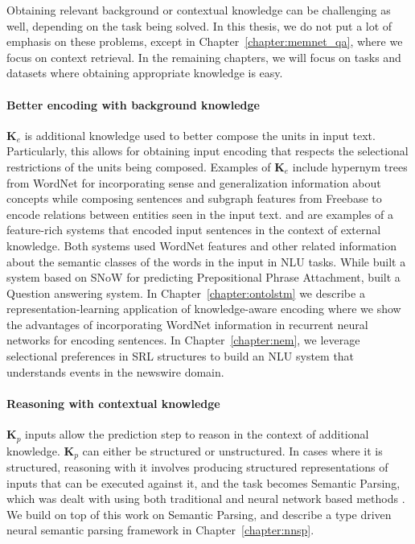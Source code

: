 Obtaining relevant background or contextual
knowledge can be challenging as well, depending on the task being solved. In this thesis, we do not put a lot of emphasis on these
problems, except in Chapter~\ref{chapter:memnet_qa}, where we focus on context retrieval. In the remaining chapters, we will focus on tasks
and datasets where obtaining appropriate knowledge is easy.

\paragraph{Better encoding with background knowledge}
$\mathbf{K}_e$ is additional knowledge used to better compose the units in input text. Particularly, this allows for
obtaining input encoding that respects the selectional restrictions of the units being composed.
Examples of $\mathbf{K}_e$ include hypernym trees from WordNet for
incorporating sense and generalization information about concepts while composing sentences and subgraph features from Freebase to encode relations
between entities seen in the input text. \cite{moldovan2001logic} and \cite{krymolowski1998incorporating} are examples of a feature-rich systems that encoded input sentences in the 
context of external knowledge. Both systems used WordNet features and other related information about the semantic classes of the words in the input in NLU tasks. While \cite{krymolowski1998incorporating} 
built a system based on SNoW \citep{CCRR99} for predicting Prepositional Phrase Attachment, \cite{moldovan2001logic} built a Question answering system. In Chapter~\ref{chapter:ontolstm} we describe
a representation-learning application of knowledge-aware encoding where we show the advantages of incorporating WordNet information in recurrent neural networks for encoding sentences. In Chapter~\ref{chapter:nem},
we leverage selectional preferences in SRL structures to build an NLU system that understands events in the newswire domain.

\paragraph{Reasoning with contextual knowledge}
$\textbf{K}_p$ inputs allow the prediction step to reason in the context of additional knowledge. $\textbf{K}_p$ can either be structured or unstructured. In cases where it is structured,
reasoning with it involves producing structured representations of inputs that can be executed against it, and the task becomes Semantic Parsing, which was dealt with using
both traditional \citep[among others]{Zelle1996LearningTP,Zettlemoyer2005LearningTM,zettlemoyer2007online} and neural network based methods
\citep{Dong2016LanguageTL,Andreas2016LearningTC,Liang2016NeuralSM,Neelakantan2016LearningAN}. We build on top of this work on Semantic Parsing, and describe a type driven neural semantic 
parsing framework in Chapter~\ref{chapter:nnsp}.

